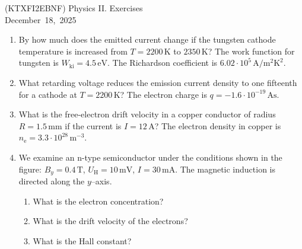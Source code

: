 \documentclass[a4paper,12pt]{letter}
\begin{document}
\begin{center}
 (KTXFI2EBNF) Physics II.  Exercises\\ \smallskip
 December~18,~2025
 \end{center}


\begin{enumerate}
  \item By how much does the emitted current change if the tungsten cathode temperature is increased from $T = 2200\,\text{K}$ to $2350\,\text{K}$?  
  The work function for tungsten is $W_{\text{ki}} = 4.5\,\text{eV}$.  
  The Richardson coefficient is $6.02 \cdot 10^{5}\,\text{A}/\text{m}^2\text{K}^2$.

\item What retarding voltage reduces the emission current density to one fifteenth for a cathode at $T = 2200\,\text{K}$?
  The electron charge is $q = -1.6 \cdot 10^{-19}\,\text{As}$.

  \item What is the free-electron drift velocity in a copper conductor of radius $R = 1.5\,\text{mm}$ if the current is $I = 12\,\text{A}$?  
  The electron density in copper is $n_{\text{e}} = 3.3 \cdot 10^{28}\,\text{m}^{-3}$.

  \item We examine an n-type semiconductor under the conditions shown in the figure:  
  $B_{y} = 0.4\,\text{T}$, $U_{\text{H}} = 10\,\text{mV}$, $I = 30\,\text{mA}$.  
  The magnetic induction is directed along the $y$–axis.

  \begin{enumerate}
    \item What is the electron concentration?
    \item What is the drift velocity of the electrons?
    \item What is the Hall constant?
  \end{enumerate}

\end{enumerate}

\bigskip


\vfill
\end{document}
